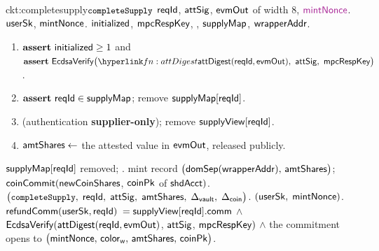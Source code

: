 \begin{CktBox}{ckt:completesupply}{$\texttt{\small completeSupply}$}
 $\mathsf{reqId}$, $\mathsf{attSig}$, $\mathsf{evmOut}$ of width $8$, $\freshrn{\mintNonce}$.
 $\mathsf{userSk}$, $\mathsf{mintNonce}$.
 $\mathsf{initialized}$, $\mathsf{mpcRespKey}$, \ADDEDINL{$\supplyView[\rid]$}, $\mathsf{supplyMap}$, $\mathsf{wrapperAddr}$.
\begin{enumerate}[nosep,leftmargin=1.7em,topsep=2pt]
\item $\textbf{assert}~ \mathsf{initialized} \geq 1$ and
      $\assert \EcdsaVf\bigl(\lnk{fn:attDigest}{\attDigest(\rid, \evmOut)}\bc \attSig\bc
      \mpcRespKey\bigr)$.
\item $\textbf{assert}~ \mathsf{reqId} \in \mathsf{supplyMap}$; \; remove $\mathsf{supplyMap}[\mathsf{reqId}]$.
\item {} (authentication \textbf{supplier-only}); \; remove $\supplyView[\rid]$.
\item $\mathsf{amtShares} \gets$ the attested value in $\mathsf{evmOut}$, released publicly.
\end{enumerate}
\begin{OutList}
\oitem{\Dvault} $\mathsf{supplyMap}[\mathsf{reqId}]$ removed; .
\oitem{\Dshd} \bluedot mint record $\bigl(\mathsf{domSep}(\mathsf{wrapperAddr}),\, \mathsf{amtShares}\bigr)$; \;
  \bluedot $\mathsf{coinCommit}(\mathsf{newCoinShares}$, $\mathsf{coinPk}$ of $\mathsf{shdAcct})$.
\oitem{\stmt} $\bigl(\texttt{\small completeSupply},\; \mathsf{reqId},\; \mathsf{attSig},\; \mathsf{amtShares},\; \Delta_{\mathsf{vault}},\;
  \Delta_{\mathsf{coin}}\bigr)$.
\oitem{\wit} $(\mathsf{userSk},\; \mathsf{mintNonce})$.
\oitem{\Rel} $\mathsf{refundComm}(\mathsf{userSk}, \mathsf{reqId})$ $= \mathsf{supplyView}[\mathsf{reqId}].\mathsf{comm}$ \;$\wedge$\;
  $\mathsf{EcdsaVerify}(\mathsf{attDigest}(\mathsf{reqId},\mathsf{evmOut})$, $\mathsf{attSig}$, $\mathsf{mpcRespKey})$ \;$\wedge$\;
  the commitment opens to
  $\bigl(\mathsf{mintNonce},\, \mathsf{color}_{\mathsf{w}},\, \mathsf{amtShares},\, \mathsf{coinPk}\bigr)$.
\end{OutList}
\end{CktBox}


